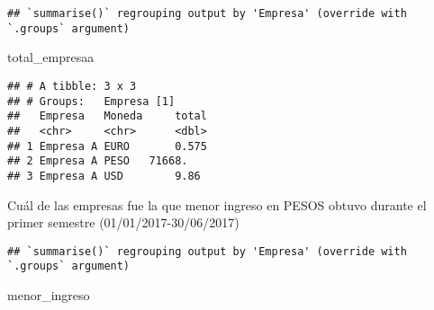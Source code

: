\documentclass[]{article}
\newenvironment{Shaded}{\begin{snugshade}}{\end{snugshade}}
\newcommand{\DataTypeTok}[1]{\textcolor[rgb]{0.13,0.29,0.53}{#1}}
\newcommand{\KeywordTok}[1]{\textcolor[rgb]{0.13,0.29,0.53}{\textbf{#1}}}
\newcommand{\NormalTok}[1]{#1}
\newcommand{\OperatorTok}[1]{\textcolor[rgb]{0.81,0.36,0.00}{\textbf{#1}}}
\newcommand{\StringTok}[1]{\textcolor[rgb]{0.31,0.60,0.02}{#1}}
\begin{document}
\begin{verbatim}
## `summarise()` regrouping output by 'Empresa' (override with `.groups` argument)
\end{verbatim}

\begin{Shaded}
\begin{Highlighting}[]
\NormalTok{total_empresaa}
\end{Highlighting}
\end{Shaded}

\begin{verbatim}
## # A tibble: 3 x 3
## # Groups:   Empresa [1]
##   Empresa   Moneda     total
##   <chr>     <chr>      <dbl>
## 1 Empresa A EURO       0.575
## 2 Empresa A PESO   71668.   
## 3 Empresa A USD        9.86
\end{verbatim}

Cuál de las empresas fue la que menor ingreso en PESOS obtuvo durante el
primer semestre (01/01/2017-30/06/2017)

\begin{Shaded}
\end{Shaded}

\begin{verbatim}
## `summarise()` regrouping output by 'Empresa' (override with `.groups` argument)
\end{verbatim}

\begin{Shaded}
\begin{Highlighting}[]
\NormalTok{menor_ingreso}
\end{Highlighting}
\end{Shaded}
\end{document}
